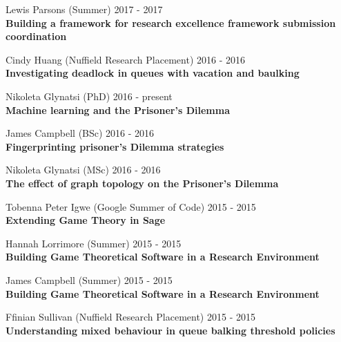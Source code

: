 \documentclass[10pt]{res} %
\begin{document}
\begin{resume}
\begin{etaremune}
\item
    Lewis Parsons (Summer) \hfill 2017 -
    2017\\
\textbf{Building a framework for research excellence framework submission coordination}\\

\item
    Cindy Huang (Nuffield Research Placement) \hfill 2016 -
    2016\\
\textbf{Investigating deadlock in queues with vacation and baulking}\\

\item
    Nikoleta Glynatsi (PhD) \hfill 2016 -
    present\\
\textbf{Machine learning and the Prisoner's Dilemma}\\

\item
    James Campbell (BSc) \hfill 2016 -
    2016\\
\textbf{Fingerprinting prisoner's Dilemma strategies}\\

\item
    Nikoleta Glynatsi (MSc) \hfill 2016 -
    2016\\
\textbf{The effect of graph topology on the Prisoner's Dilemma}\\

\item
    Tobenna Peter Igwe (Google Summer of Code) \hfill 2015 -
    2015\\
\textbf{Extending Game Theory in Sage}\\

\item
    Hannah Lorrimore (Summer) \hfill 2015 -
    2015\\
\textbf{Building Game Theoretical Software in a Research Environment}\\

\item
    James Campbell (Summer) \hfill 2015 -
    2015\\
\textbf{Building Game Theoretical Software in a Research Environment}\\

\item
    Ffinian Sullivan (Nuffield Research Placement) \hfill 2015 -
    2015\\
\textbf{Understanding mixed behaviour in queue balking threshold policies}\\


\end{etaremune}
\end{resume}
\end{document}

